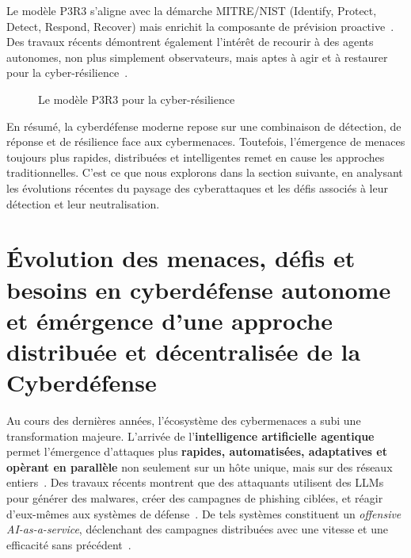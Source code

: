 \documentclass[ twoside,openright,titlepage,numbers=noenddot,headinclude,%
                footinclude=true,cleardoublepage=empty,abstractoff, %
                BCOR=5mm,paper=a4,fontsize=11pt,%
                french,american,%
                ]{scrreprt}
\begin{document}
Le modèle P3R3 s'aligne avec la démarche MITRE/NIST (Identify, Protect, Detect, Respond, Recover) mais enrichit la composante de prévision proactive~\cite{Theron2013P3R3}.
Des travaux récents démontrent également l'intérêt de recourir à des agents autonomes, non plus simplement observateurs, mais aptes à agir et à restaurer pour la cyber-résilience~\cite{Kott2020doers}.

\begin{figure}[h]
  \centering
  \caption{Le modèle P3R3 pour la cyber-résilience}
  \label{fig:P3R3_model}
\end{figure}

\noindent
En résumé, la cyberdéfense moderne repose sur une combinaison de détection, de réponse et de résilience face aux cybermenaces. Toutefois, l'émergence de menaces toujours plus rapides, distribuées et intelligentes remet en cause les approches traditionnelles. C'est ce que nous explorons dans la section suivante, en analysant les évolutions récentes du paysage des cyberattaques et les défis associés à leur détection et leur neutralisation.


\section{Évolution des menaces, défis et besoins en cyberdéfense autonome et émérgence d'une approche distribuée et décentralisée de la Cyberdéfense}\label{sec:evolution-menaces}


Au cours des dernières années, l'écosystème des cybermenaces a subi une transformation majeure. L'arrivée de l'\textbf{intelligence artificielle agentique} permet l'émergence d'attaques plus \textbf{rapides, automatisées, adaptatives et opèrant en parallèle} non seulement sur un hôte unique, mais sur des réseaux entiers~\cite{Tarraf2021}. Des travaux récents montrent que des attaquants utilisent des LLMs pour générer des malwares, créer des campagnes de phishing ciblées, et réagir d'eux-mêmes aux systèmes de défense~\cite{AutoAttacker2024}. De tels systèmes constituent un {\em offensive AI-as-a-service}, déclenchant des campagnes distribuées avec une vitesse et une efficacité sans précédent~\cite{AgenticAIThreats2025}.
\end{document}
